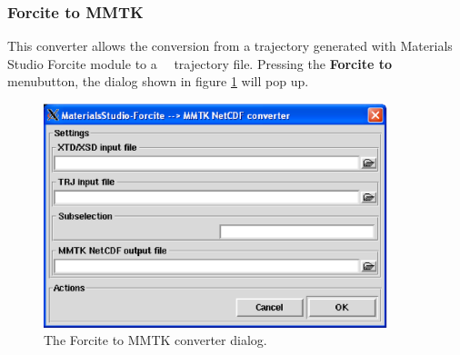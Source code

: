 \documentclass[a4paper,11pt]{report}
\begin{document}
\subsubsection{Forcite to MMTK}
\label{forcite_to_mmtk}
This converter allows the conversion from a trajectory generated with Materials Studio Forcite module \cite{Forcite} to a 
\MMTK\ \NetCDF\ trajectory file. Pressing the \textbf{Forcite to \MMTK\ } menubutton, the dialog shown in figure \ref{fig:forcite_converter} will pop up.
\begin{figure}[h!]
\begin{center}
\includegraphics[width=10cm]{Figures/forcite_converter.eps}
\end{center}
\caption[The Forcite to MMTK converter dialog]{The Forcite to MMTK converter dialog.}
\label{fig:forcite_converter}
\end{figure}   
\end{document}
